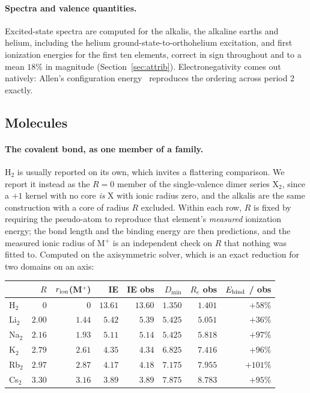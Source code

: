 \documentclass[11pt]{article}
\begin{document}
\paragraph{Spectra and valence quantities.} Excited-state spectra are computed for the alkalis,
the alkaline earths and helium, including the helium ground-state-to-orthohelium excitation, and
first ionization energies for the first ten elements, correct in sign throughout and to a mean
$18\%$ in magnitude (Section~\ref{sec:attrib}). Electronegativity comes out
natively: Allen's configuration energy~\cite{Allen1989} reproduces the ordering across period 2 exactly.

\subsection{Molecules}

\paragraph{The covalent bond, as one member of a family.} H$_2$ is usually reported on its own,
which invites a flattering comparison. We report it instead as the $R=0$ member of the
single-valence dimer series X$_2$, since a $+1$ kernel with no core \emph{is} X with ionic radius
zero, and the alkalis are the same construction with a core of radius $R$ excluded. Within each
row, $R$ is fixed by requiring the pseudo-atom to reproduce that element's \emph{measured}
ionization energy; the bond length and the binding energy are then predictions, and the measured
ionic radius of M$^+$ is an independent check on $R$ that nothing was fitted to. Computed on the
axisymmetric solver, which is an exact reduction for two domains on an axis:

\begin{center}
\begin{tabular}{lrrrrrrr}
\toprule
 & $R$ & $r_{\rm ion}$(M$^+$) & IE & IE obs & $D_{\min}$ & $R_e$ obs & $E_{\rm bind}$ / obs \\
\midrule
H$_2$  & $0$     & $0$     & $13.61$ & $13.60$ & $1.350$ & $1.401$ & $+58\%$ \\
Li$_2$ & $2.00$  & $1.44$  & $5.42$  & $5.39$  & $5.425$ & $5.051$ & $+36\%$ \\
Na$_2$ & $2.16$  & $1.93$  & $5.11$  & $5.14$  & $5.425$ & $5.818$ & $+97\%$ \\
K$_2$  & $2.79$  & $2.61$  & $4.35$  & $4.34$  & $6.825$ & $7.416$ & $+96\%$ \\
Rb$_2$ & $2.97$  & $2.87$  & $4.17$  & $4.18$  & $7.175$ & $7.955$ & $+101\%$ \\
Cs$_2$ & $3.30$  & $3.16$  & $3.89$  & $3.89$  & $7.875$ & $8.783$ & $+95\%$ \\
\bottomrule
\end{tabular}
\end{center}
\end{document}
